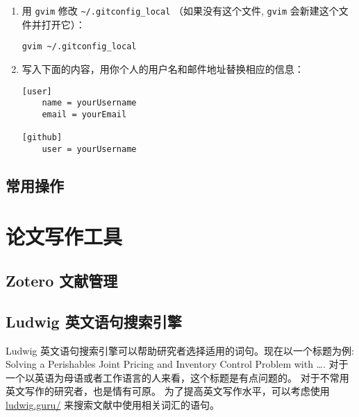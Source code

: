 \documentclass[
    11pt,
    base=hide,
    cite=authoryear,
    device=phone,
    lang=cn,
    mode=simple,
    result=answer,
    toc=onecol,
]{elegantbook_sierxue}
\begin{document}
\begin{enumerate}
    \item 用 \lstinline{gvim} 修改 \lstinline{~/.gitconfig_local}
        （如果没有这个文件, \lstinline{gvim} 会新建这个文件并打开它）：
\begin{lstlisting}[style=lst]
gvim ~/.gitconfig_local
\end{lstlisting}
    \item 写入下面的内容，用你个人的用户名和邮件地址替换相应的信息：
\begin{lstlisting}[style=lst]
[user]
	name = yourUsername
	email = yourEmail

[github]
	user = yourUsername
\end{lstlisting}
\end{enumerate}

%
%
%
%
\newpage
\section{常用操作}%
\label{sec:git-tips}
%

\chapter{论文写作工具}%
\label{cha:tools-writing}

\section{Zotero 文献管理}%
\label{sec:citation-zotero}

\newpage
\section{Ludwig 英文语句搜索引擎}%
\label{sec:writing-ludwig}

Ludwig 英文语句搜索引擎可以帮助研究者选择适用的词句。现在以一个标题为例:
Solving a Perishables Joint Pricing and Inventory Control Problem
with \ldots.
对于一个以英语为母语或者工作语言的人来看，这个标题是有点问题的。
对于不常用英文写作的研究者，也是情有可原。
为了提高英文写作水平，可以考虑使用
\href{https://ludwig.guru/}{ludwig.guru/} 来搜索文献中使用相关词汇的语句。
\end{document}
